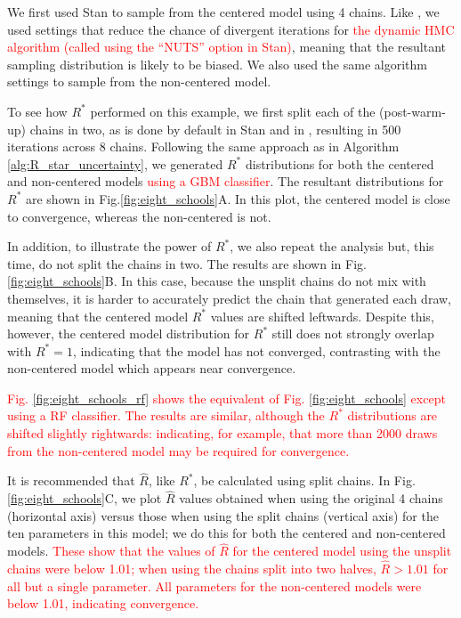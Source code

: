 \documentclass{article}
\begin{document}
We first used Stan \citep{carpenter2017stan} to sample from the centered model using 4 chains. Like \cite{vehtari2019rank}, we used settings that reduce the chance of divergent iterations for \textcolor{red}{the dynamic HMC algorithm \citep{betancourt2017conceptual} (called using the ``NUTS'' option in Stan)}, meaning that the resultant sampling distribution is likely to be biased. We also used the same algorithm settings to sample from the non-centered model.

To see how $R^*$ performed on this example, we first split each of the (post-warm-up) chains in two, as is done by default in Stan \citep{carpenter2017stan} and in \cite{vehtari2019rank}, resulting in 500 iterations across 8 chains. Following the same approach as in Algorithm \ref{alg:R_star_uncertainty}, we generated $R^*$ distributions for both the centered and non-centered models \textcolor{red}{using a GBM classifier}. The resultant distributions for $R^*$ are shown in Fig.\ref{fig:eight_schools}A. In this plot, the centered model is close to convergence, whereas the non-centered is not.

In addition, to illustrate the power of $R^*$, we also repeat the analysis but, this time, do not split the chains in two. The results are shown in Fig.\ref{fig:eight_schools}B. In this case, because the unsplit chains do not mix with themselves, it is harder to accurately predict the chain that generated each draw, meaning that the centered model $R^*$ values are shifted leftwards. Despite this, however, the centered model distribution for $R^*$ still does not strongly overlap with $R^*=1$, indicating that the model has not converged, contrasting with the non-centered model which appears near convergence.

\textcolor{red}{Fig. \ref{fig:eight_schools_rf} shows the equivalent of Fig. \ref{fig:eight_schools} except using a RF classifier. The results are similar, although the $R^*$ distributions are shifted slightly rightwards: indicating, for example, that more than 2000 draws from the non-centered model may be required for convergence.}

It is recommended that $\widehat{R}$, like $R^*$, be calculated using split chains. In Fig. \ref{fig:eight_schools}C, we plot $\widehat{R}$ values obtained when using the original 4 chains (horizontal axis) versus those when using the split chains (vertical axis) for the ten parameters in this model; we do this for both the centered and non-centered models. \textcolor{red}{These show that the values of $\widehat{R}$ for the centered model using the unsplit chains were below 1.01; when using the chains split into two halves, $\widehat{R}>1.01$ for all but a single parameter. All parameters for the non-centered models were below 1.01, indicating convergence.}
\end{document}
